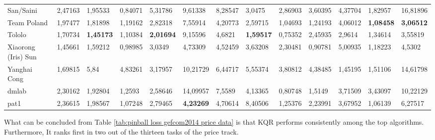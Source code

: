 \begin{table}[!ht]
\begin{adjustbox}{width=\textwidth}
\begin{tabular}{lllllllllllll}
  San/Saini                  & 2,47163          & 1,95533          & 0,84071 & 5,31786          & 9,61338          & 8,28547          & 3,0475           & 2,86903          & 3,60395          & 4,37704          & 1,82957          & 16,81896         \\
  Team Poland                & 1,97477          & 1,81898          & 1,19162          & 2,82318          & 7,55914          & 4,20773          & 2,59715          & 1,04693          & 1,24193          & 4,06012          & \textbf{1,08458} & \textbf{3,06512} \\
  Tololo                     & 1,70734          & \textbf{1,45173} & 1,10384          & \textbf{2,01694} & 9,15596          & 4,6821           & \textbf{1,59517} & 0,75352          & 2,45935          & 2,9614           & 1,34614          & 3,55819          \\
  Xiaorong (Iris) Sun        & 1,45661          & 1,59212          & 0,98985          & 3,0349           & 4,73309          & 4,52459          & 3,63208          & 2,30481          & 0,90781          & 5,00935          & 1,18223          & 4,5302           \\
  Yanghai Cong               & 1,69815          & 5,84             & 4,83261          & 3,17957          & 10,21729         & 6,44717          & 5,55374          & 3,80812          & 4,38485          & 1,45195          & 1,51106          & 14,61798         \\
  dmlab                      & 2,30162          & 1,92804          & 1,2593           & 2,58646          & 14,09957         & 7,5589           & 4,13365          & 0,80748          & 1,5149           & 3,71509          & 3,43097          & 10,22129         \\
  pat1                       & 2,36615          & 1,98567          & 1,07248          & 2,79465          & \textbf{4,23269} & 4,70614          & 8,40506          & 1,25376          & 2,23991          & 3,67952          & 1,06139          & 6,27517         
  
  \end{tabular}
    \end{adjustbox}
  \end{table}

What can be concluded from Table \ref{tab:pinball loss gefcom2014 price data} is that KQR performs consistently among the top algorithms. Furthermore, It ranks first in two out of the thirteen tasks of the price track.
